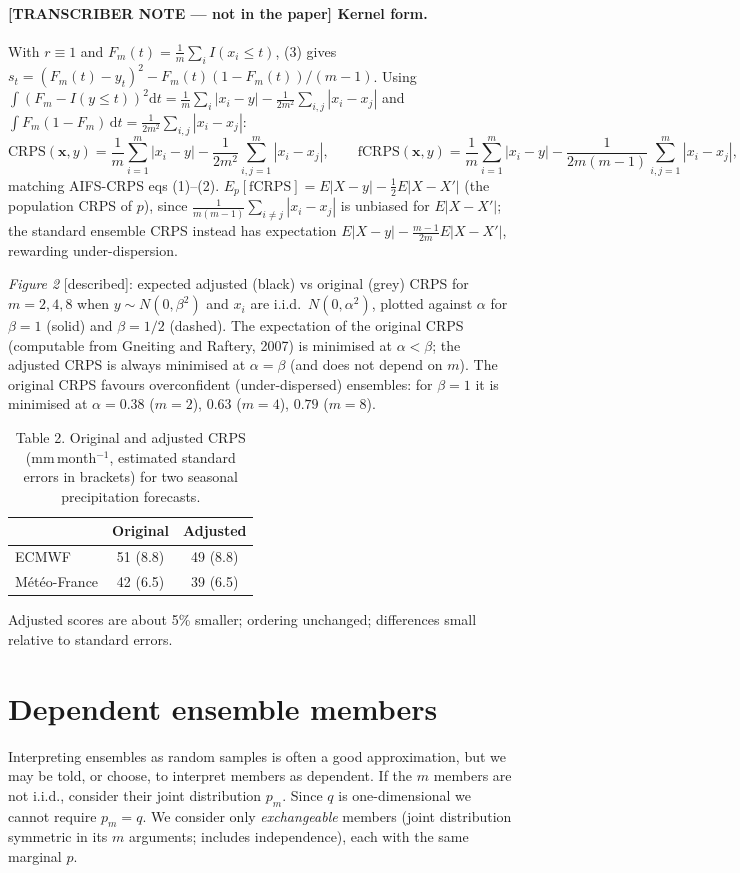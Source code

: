 \documentclass{article}
\newcommand{\bx}{\mathbf{x}}
\newcommand{\dd}{\mathrm{d}}
\begin{document}
\paragraph{[TRANSCRIBER NOTE --- not in the paper] Kernel form.}
With $r\equiv1$ and $F_m(t)=\frac1m\sum_i I(x_i\le t)$, (3) gives
$s_t=(F_m(t)-y_t)^2 - F_m(t)(1-F_m(t))/(m-1)$. Using
$\int(F_m-I(y\le t))^2\dd t=\frac1m\sum_i|x_i-y|-\frac1{2m^2}\sum_{i,j}|x_i-x_j|$
and $\int F_m(1-F_m)\,\dd t=\frac{1}{2m^2}\sum_{i,j}|x_i-x_j|$:
\[
  \mathrm{CRPS}(\bx,y)=\frac1m\sum_{i=1}^m|x_i-y|-\frac{1}{2m^2}\sum_{i,j=1}^m|x_i-x_j|,
  \qquad
  \mathrm{fCRPS}(\bx,y)=\frac1m\sum_{i=1}^m|x_i-y|-\frac{1}{2m(m-1)}\sum_{i,j=1}^m|x_i-x_j|,
\]
matching AIFS-CRPS eqs (1)--(2). $E_p[\mathrm{fCRPS}]=E|X-y|-\tfrac12E|X-X'|$
(the population CRPS of $p$), since $\frac{1}{m(m-1)}\sum_{i\ne j}|x_i-x_j|$ is
unbiased for $E|X-X'|$; the standard ensemble CRPS instead has expectation
$E|X-y|-\frac{m-1}{2m}E|X-X'|$, rewarding under-dispersion.

\emph{Figure 2} [described]: expected adjusted (black) vs original (grey)
CRPS for $m=2,4,8$ when $y\sim N(0,\beta^2)$ and $x_i$ are i.i.d.\
$N(0,\alpha^2)$, plotted against $\alpha$ for $\beta=1$ (solid) and
$\beta=1/2$ (dashed). The expectation of the original CRPS (computable from
Gneiting and Raftery, 2007) is minimised at $\alpha<\beta$; the adjusted CRPS
is always minimised at $\alpha=\beta$ (and does not depend on $m$). The original
CRPS favours overconfident (under-dispersed) ensembles: for $\beta=1$ it is
minimised at $\alpha=0.38$ ($m=2$), $0.63$ ($m=4$), $0.79$ ($m=8$).

\begin{table}[h]
\centering
\caption*{Table 2. Original and adjusted CRPS (mm\,month$^{-1}$, estimated
standard errors in brackets) for two seasonal precipitation forecasts.}
\begin{tabular}{lcc}
 & Original & Adjusted\\\hline
ECMWF & 51 (8.8) & 49 (8.8)\\
M\'et\'eo-France & 42 (6.5) & 39 (6.5)
\end{tabular}
\end{table}
Adjusted scores are about 5\% smaller; ordering unchanged; differences small
relative to standard errors.

\section{Dependent ensemble members}
Interpreting ensembles as random samples is often a good approximation, but we
may be told, or choose, to interpret members as dependent. If the $m$ members
are not i.i.d., consider their joint distribution $p_m$. Since $q$ is
one-dimensional we cannot require $p_m=q$. We consider only
\emph{exchangeable} members (joint distribution symmetric in its $m$
arguments; includes independence), each with the same marginal $p$.
\end{document}
